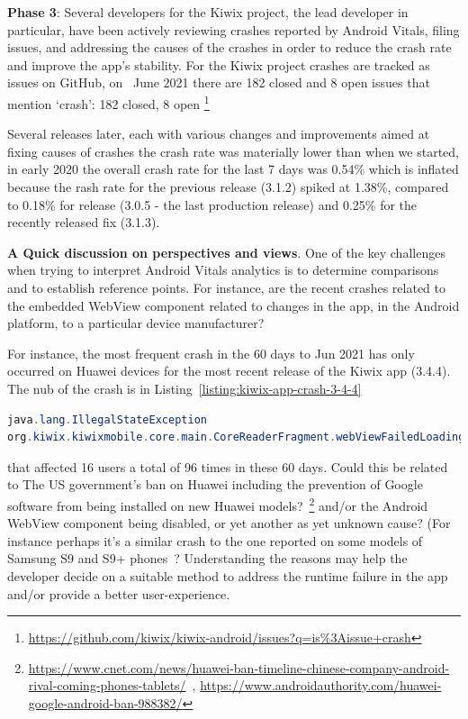 \textbf{Phase 3}: Several developers for the Kiwix project, the lead developer in particular, have been actively reviewing crashes reported by Android Vitals, filing issues, and addressing the causes of the crashes in order to reduce the crash rate and improve the app's stability. For the Kiwix project crashes are tracked as issues on GitHub, on~ June 2021 there are 182 closed and 8 open issues that mention `crash': 182 closed, 8 open %
\footnote{\url{https://github.com/kiwix/kiwix-android/issues?q=is\%3Aissue+crash}}

Several releases later, each with various changes and improvements aimed at fixing causes of crashes the crash rate was materially lower than when we started, in early 2020 the overall crash rate for the last 7 days was 0.54\% which is inflated because the rash rate for the previous release (3.1.2) spiked at 1.38\%, compared to 0.18\% for release (3.0.5 -  the last production release) and 0.25\% for the recently released fix (3.1.3).


\textbf{A Quick discussion on perspectives and views}. 
One of the key challenges when trying to interpret Android Vitals analytics is to determine comparisons and to establish reference points. For instance, are the recent crashes related to the embedded WebView component related to changes in the app, in the Android platform, to a particular device manufacturer? 

For instance, the most frequent crash in the 60 days to  Jun 2021 has only occurred on Huawei devices for the most recent release of the Kiwix app (3.4.4). The nub of the crash is in Listing~\ref{listing:kiwix-app-crash-3-4-4}

\begin{lstlisting}[language=java, caption=Extract of stack trace for the most frequent crash in release 3.4.4 of Kiwix, label=listing:kiwix-app-crash-3-4-4]
java.lang.IllegalStateException
org.kiwix.kiwixmobile.core.main.CoreReaderFragment.webViewFailedLoading
\end{lstlisting}

that affected 16 users a total of 96 times in these 60 days. %
Could this be related to The US government's ban on Huawei including the prevention of Google software from being installed on new Huawei models?~\footnote{\url{https://www.cnet.com/news/huawei-ban-timeline-chinese-company-android-rival-coming-phones-tablets/}~\citep{androidauthority2021_the_huawei_ban}, \url{https://www.androidauthority.com/huawei-google-android-ban-988382/}} and/or the Android WebView component being disabled, or yet another as yet unknown cause? (For instance perhaps it's a similar crash to the one reported on some models of Samsung S9 and S9+ phones~\citep{ebling2018_so_s9_specific_webview_device_crash_report}? Understanding the reasons may help the developer decide on a suitable method to address the runtime failure in the app and/or provide a better user-experience.


